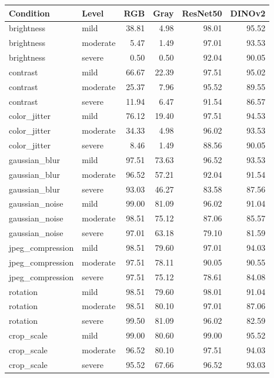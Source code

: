 \begin{tabular}{llrrrr}
\toprule
Condition & Level & RGB & Gray & ResNet50 & DINOv2 \\
\midrule
brightness & mild & 38.81 & 4.98 & 98.01 & 95.52 \\
brightness & moderate & 5.47 & 1.49 & 97.01 & 93.53 \\
brightness & severe & 0.50 & 0.50 & 92.04 & 90.05 \\
contrast & mild & 66.67 & 22.39 & 97.51 & 95.02 \\
contrast & moderate & 25.37 & 7.96 & 95.52 & 89.55 \\
contrast & severe & 11.94 & 6.47 & 91.54 & 86.57 \\
color\_jitter & mild & 76.12 & 19.40 & 97.51 & 94.53 \\
color\_jitter & moderate & 34.33 & 4.98 & 96.02 & 93.53 \\
color\_jitter & severe & 8.46 & 1.49 & 88.56 & 90.05 \\
gaussian\_blur & mild & 97.51 & 73.63 & 96.52 & 93.53 \\
gaussian\_blur & moderate & 96.52 & 57.21 & 92.04 & 91.54 \\
gaussian\_blur & severe & 93.03 & 46.27 & 83.58 & 87.56 \\
gaussian\_noise & mild & 99.00 & 81.09 & 96.02 & 91.04 \\
gaussian\_noise & moderate & 98.51 & 75.12 & 87.06 & 85.57 \\
gaussian\_noise & severe & 97.01 & 63.18 & 79.10 & 81.59 \\
jpeg\_compression & mild & 98.51 & 79.60 & 97.01 & 94.03 \\
jpeg\_compression & moderate & 97.51 & 78.11 & 90.05 & 90.55 \\
jpeg\_compression & severe & 97.51 & 75.12 & 78.61 & 84.08 \\
rotation & mild & 98.51 & 79.60 & 98.01 & 91.04 \\
rotation & moderate & 98.51 & 80.10 & 97.01 & 87.06 \\
rotation & severe & 99.50 & 81.09 & 96.02 & 82.59 \\
crop\_scale & mild & 99.00 & 80.60 & 99.00 & 95.52 \\
crop\_scale & moderate & 96.52 & 80.10 & 97.51 & 94.03 \\
crop\_scale & severe & 95.52 & 67.66 & 96.52 & 93.03 \\
\bottomrule
\end{tabular}
